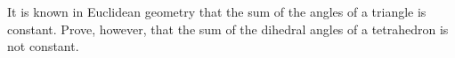 It is known in Euclidean geometry that the sum of the angles of a triangle is constant.  Prove, however, that the sum of the dihedral angles of a tetrahedron is not constant.